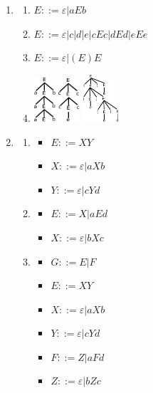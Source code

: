 \begin{enumerate}
\begin{enumerate}
		\end{enumerate}
	\item
		\begin{enumerate}
			\item $E ::= \varepsilon | aEb$
			\item $E ::= \varepsilon | c | d | e | cEc | dEd | eEe$
			\item $E ::= \varepsilon | (E)E$
			\item \includegraphics[width=30px]{Images/fig7.pdf} \includegraphics[width=30px]{Images/fig8.pdf} \includegraphics[width=50px]{Images/fig9.pdf}
		\end{enumerate}
	\item 
		\begin{enumerate}
			\item 
				\begin{itemize}
					\item $E ::= XY$
					\item $X ::= \varepsilon | aXb$
					\item $Y ::= \varepsilon | cYd$
				\end{itemize}
			\item
				\begin{itemize}
					\item $E ::= X | aEd$
					\item $X ::= \varepsilon | bXc$
				\end{itemize}
			\item
				\begin{itemize}
					\item $G ::= E | F$
					\item $E ::= XY$
					\item $X ::= \varepsilon | aXb$
					\item $Y ::= \varepsilon | cYd$
					\item $F ::= Z | aFd$
					\item $Z ::= \varepsilon | bZc$

\end{itemize}
\end{enumerate}
\end{enumerate}
